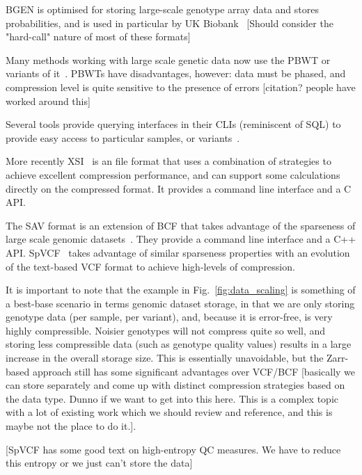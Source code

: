 \documentclass[9pt,lineno]{elife}
\begin{document}
BGEN \citep{band2018bgen} is optimised for storing large-scale
genotype array data and stores probabilities, and is used
in particular by UK Biobank~\citep{bycroft2017genome}
[Should consider the "hard-call" nature of most of these formats]

Many methods working with large scale genetic
data now use the PBWT or variants of
it~\citep[e.g.][]{li2016bgt,lefaive2021sparse,wertenbroek2022xsi}. PBWTs have
disadvantages, however: data must be phased, and compression level
is quite sensitive to the presence of errors [citation? people have
worked around this]


Several tools provide querying interfaces in their CLIs
(reminiscent of SQL) to provide easy access to particular samples, or
variants~\cite{li2016bgt,layer2016efficient}.

More recently XSI~\citep{wertenbroek2022xsi} is an file format that
uses a combination of strategies to achieve excellent compression
performance, and can support some calculations directly on the
compressed format. It provides a command line interface and a
C API.

The SAV format is an extension of BCF that takes advantage
of the sparseness of large scale genomic datasets~\citep{lefaive2021sparse}.
They provide a command line interface and a C++ API.
SpVCF~\citep{lin2020sparse} takes advantage of similar sparseness
properties with an evolution of the text-based VCF format to
achieve high-levels of compression.

\citep{deorowicz2013genome,deorowicz2019gtshark}

\citep{tatwawadi2016gtrac}

It is important to note that the example in Fig.~\ref{fig:data_scaling}
is something of a best-base
scenario in terms genomic dataset storage, in that we are only
storing genotype data (per sample, per variant),
and, because it is error-free, is very
highly compressible. Noisier genotypes will not compress quite
so well, and storing less compressible data (such as genotype
quality values) results in a large increase in the overall
storage size. This is essentially unavoidable, but the Zarr-based
approach still has some significant advantages over VCF/BCF
[basically we can store separately and come up with distinct
compression strategies based on the data type. Dunno if we
want to get into this here. This is a complex topic with
a lot of existing work which we should review and reference,
and this is maybe not the place to do it.].

[SpVCF has some good text on high-entropy QC measures. We have to
reduce this entropy or we just can't store the data]
\end{document}
